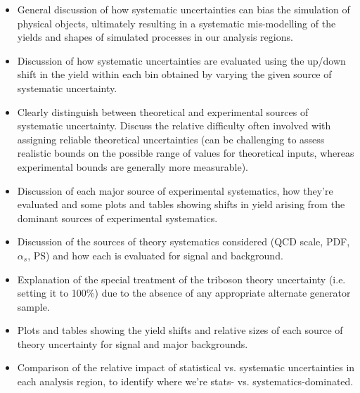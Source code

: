 \label{chapter:systematics}

\begin{itemize}
\item General discussion of how systematic uncertainties can bias the simulation of physical objects, ultimately resulting in a systematic mis-modelling of the yields and shapes of simulated processes in our analysis regions.
\item Discussion of how systematic uncertainties are evaluated using the up/down shift in the yield within each bin obtained by varying the given source of systematic uncertainty.  
\item Clearly distinguish between theoretical and experimental sources of systematic uncertainty. Discuss the relative difficulty often involved with assigning reliable theoretical uncertainties (can be challenging to assess realistic bounds on the possible range of values for theoretical inputs, whereas experimental bounds are generally more measurable). 
\item Discussion of each major source of experimental systematics, how they're evaluated and some plots and tables showing shifts in yield arising from the dominant sources of experimental systematics.
\item Discussion of the sources of theory systematics considered (QCD scale, PDF, $\alpha_s$, PS) and how each is evaluated for signal and background.
\item Explanation of the special treatment of the triboson theory uncertainty (i.e. setting it to 100\%) due to the absence of any appropriate alternate generator sample.
\item Plots and tables showing the yield shifts and relative sizes of each source of theory uncertainty for signal and major backgrounds.
\item Comparison of the relative impact of statistical vs. systematic uncertainties in each analysis region, to identify where we're stats- vs. systematics-dominated.
\end{itemize}
